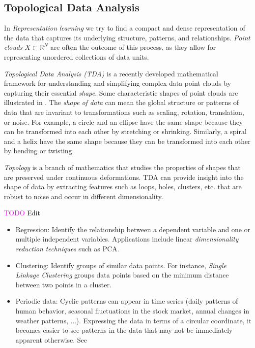 \documentclass[11pt, a4paper]{amsart}
\begin{document}
\subsection{Topological Data Analysis}

In \emph{Representation learning} we try to find a compact and dense representation of the data that captures its underlying structure, patterns, and relationships.
\emph{Point clouds} $X \subset \mathbb{R}^{N}$ are often the outcome of this process, as they allow for representing unordered collections of data units.

\emph{Topological Data Analysis (TDA)} \cite{carlsson2022topologicaldataanalysis} is a recently developed mathematical framework for understanding and simplifying complex data point clouds by capturing their essential \emph{shape}.
Some characteristic shapes of point clouds are illustrated in .
The \emph{shape of data} can mean the global structure or patterns of data that are invariant to transformations such as scaling, rotation, translation, or noise.
For example, a circle and an ellipse have the same shape because they can be transformed into each other by stretching or shrinking. 
Similarly, a spiral and a helix have the same shape because they can be transformed into each other by bending or twisting.

\emph{Topology} is a branch of mathematics that studies the properties of shapes that are preserved under continuous deformations.
TDA can provide insight into the shape of data by extracting features such as loops, holes, clusters, etc. that are robust to noise and occur in different dimensionality.

\textcolor{magenta}{TODO} Edit

\begin{itemize}
	\item Regression:
	Identify the relationship between a dependent variable and one or multiple independent variables.
	Applications include linear \emph{dimensionality reduction techniques} such as PCA.
	\item Clustering:
	Identify groups of similar data points.
	For instance, \emph{Single Linkage Clustering} groups data points based on the minimum distance between two points in a cluster.
	\item Periodic data:
	Cyclic patterns can appear in time series (daily patterns of human behavior, seasonal fluctuations in the stock market, annual changes in weather patterns, ...).
	Expressing the data in terms of a circular coordinate, it becomes easier to see patterns in the data that may not be immediately apparent otherwise.
	See 
\end{itemize}
\end{document}
